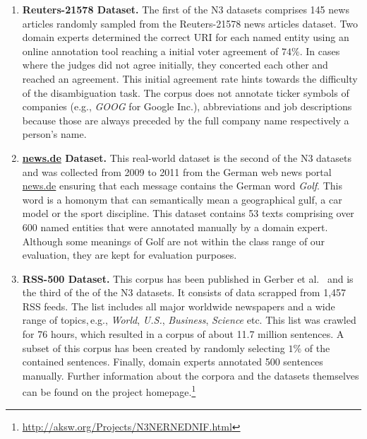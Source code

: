 \documentclass{llncs}
\begin{document}
\begin{enumerate}
\item \textbf{Reuters-21578 Dataset.}
The first of the N3 datasets comprises 145 news articles randomly sampled from the Reuters-21578 news articles dataset.
Two domain experts determined the correct URI for each named entity using an online annotation tool reaching a initial voter agreement of $74\%$.
In cases where the judges did not agree initially, they concerted each other and reached an agreement.
This initial agreement rate hints towards the difficulty of the disambiguation task.
The corpus does not annotate ticker symbols of companies (e.g., \textit{GOOG} for Google Inc.), abbreviations and job descriptions because those are always preceded by the full company name respectively a person's name.

\item \textbf{\url{news.de} Dataset.}
This real-world dataset is the second of the N3 datasets and was collected from 2009 to 2011 from the German web news portal \url{news.de} ensuring that each message contains the German word \emph{Golf}.
This word is a homonym that can semantically mean a geographical gulf, a car model or the sport discipline.
This dataset contains 53 texts comprising over 600 named entities that were annotated manually by a domain expert.
Although some meanings of Golf are not within the class range of our evaluation, they are kept for evaluation purposes.

\item \textbf{RSS-500 Dataset.}
This corpus has been published in Gerber et al.~\cite{GER+13} and is the third of the of the N3 datasets.
It consists of data scrapped from 1,457 RSS feeds. %
The list includes all major worldwide newspapers and a wide range of topics,\,e.g., \emph{World}, \emph{U.S.}, \emph{Business}, \emph{Science} etc.
This list was crawled for 76 hours, which resulted in a corpus of about 11.7 million sentences.
A subset of this corpus has been created by randomly selecting $1\%$ of the contained sentences.
Finally, domain experts annotated 500 sentences manually. 
Further information about the corpora and the datasets themselves can be found on the project homepage.\footnote{\url{http://aksw.org/Projects/N3NERNEDNIF.html}}


\end{enumerate}
\end{document}
